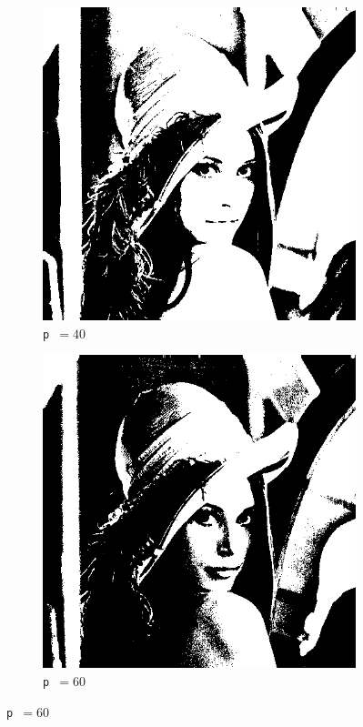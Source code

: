 \documentclass[12pt]{article}
\begin{document}
\begin{figure}[H]
      \vspace{0.02\textwidth}

      \begin{subfigure}[b]{0.33\textwidth}
        \centering
        \includegraphics[width=\textwidth]{img/lena-threshold-40.png}
        \caption*{\texttt{p }\( = 40\)}
      \end{subfigure}
      \hspace{0.15\textwidth}
      \begin{subfigure}[b]{0.33\textwidth}
        \centering
        \includegraphics[width=\textwidth]{img/lena-threshold-60.png}
        \caption*{\texttt{p }\( = 60\)}
      \end{subfigure}


\end{figure}
\end{document}
